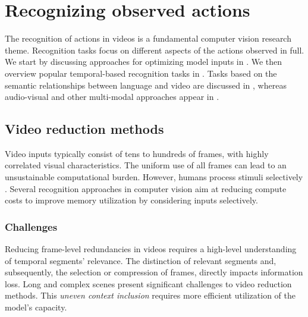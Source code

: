 \section{Recognizing observed actions}
\label{sec:recognition}

The recognition of actions in videos is a fundamental computer vision research theme. Recognition tasks focus on different aspects of the actions observed in full. We start by discussing approaches for optimizing model inputs in . We then overview popular temporal-based recognition tasks in . Tasks based on the semantic relationships between language and video are discussed in , whereas audio-visual and other multi-modal approaches appear in . %


\subsection{Video reduction methods}
\label{sec:recognition::inputs}

Video inputs typically consist of tens to hundreds of frames, with highly correlated visual characteristics. The uniform use of all frames can lead to an unsustainable computational burden. However, humans process stimuli selectively \citep{eagleman2010does}. %
Several recognition approaches in computer vision aim at reducing compute costs to improve memory utilization by considering inputs selectively.


\subsubsection{Challenges}
 

Reducing frame-level redundancies in videos requires a high-level understanding of temporal segments' relevance. The distinction of relevant segments and, subsequently, the selection or compression of frames, directly impacts information loss. Long and complex scenes present significant challenges to video reduction methods. This \textit{uneven context inclusion} requires more efficient utilization of the model's capacity.

